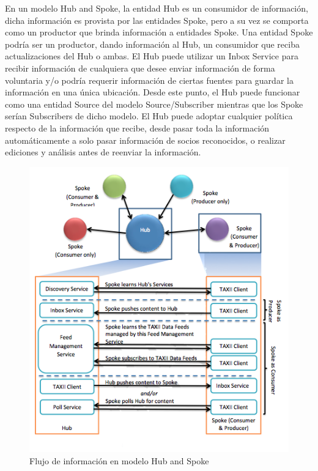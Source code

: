 En un modelo Hub and Spoke, la entidad Hub es un consumidor de 
información, dicha información es provista por las entidades Spoke, pero a su vez se comporta como
un productor que brinda información a entidades 
Spoke. Una entidad Spoke podría ser un productor, dando información al Hub, un 
consumidor que reciba actualizaciones del Hub o ambas. El Hub puede utilizar un 
Inbox Service para recibir información de cualquiera que desee enviar 
información de forma voluntaria y/o podría requerir información de ciertas 
fuentes para guardar la información en una única ubicación. Desde este punto, el 
Hub puede funcionar como una entidad Source del modelo Source/Subscriber 
mientras que los Spoke serían Subscribers de dicho modelo. El Hub puede adoptar 
cualquier política respecto de la información que recibe, desde pasar toda la 
información automáticamente a solo pasar información de socios reconocidos, o 
realizar ediciones y análisis antes de reenviar la información.

\begin{figure}[ht!]
  \centering
    \includegraphics[scale=0.75]{./images/HubAndSpokeModel.png}
    \caption{Flujo de información en modelo Hub and Spoke \protect\cite{b1}}
    \label{fig.hubandspokemodel}
\end{figure}

